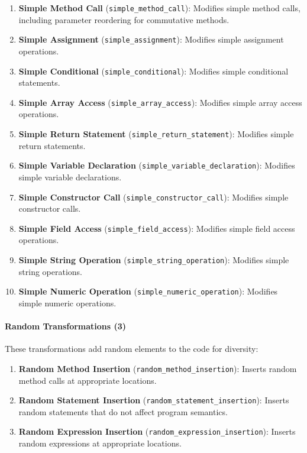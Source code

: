 \documentclass[acmsmall,screen,review,anonymous]{acmart}
\begin{document}
\begin{enumerate}
    \item \textbf{Simple Method Call} (\texttt{simple\_method\_call}): Modifies simple method calls, including parameter reordering for commutative methods.
    
    \item \textbf{Simple Assignment} (\texttt{simple\_assignment}): Modifies simple assignment operations.
    
    \item \textbf{Simple Conditional} (\texttt{simple\_conditional}): Modifies simple conditional statements.
    
    \item \textbf{Simple Array Access} (\texttt{simple\_array\_access}): Modifies simple array access operations.
    
    \item \textbf{Simple Return Statement} (\texttt{simple\_return\_statement}): Modifies simple return statements.
    
    \item \textbf{Simple Variable Declaration} (\texttt{simple\_variable\_declaration}): Modifies simple variable declarations.
    
    \item \textbf{Simple Constructor Call} (\texttt{simple\_constructor\_call}): Modifies simple constructor calls.
    
    \item \textbf{Simple Field Access} (\texttt{simple\_field\_access}): Modifies simple field access operations.
    
    \item \textbf{Simple String Operation} (\texttt{simple\_string\_operation}): Modifies simple string operations.
    
    \item \textbf{Simple Numeric Operation} (\texttt{simple\_numeric\_operation}): Modifies simple numeric operations.
\end{enumerate}

\paragraph{Random Transformations (3)}
These transformations add random elements to the code for diversity:

\begin{enumerate}
    \item \textbf{Random Method Insertion} (\texttt{random\_method\_insertion}): Inserts random method calls at appropriate locations.
    
    \item \textbf{Random Statement Insertion} (\texttt{random\_statement\_insertion}): Inserts random statements that do not affect program semantics.
    
    \item \textbf{Random Expression Insertion} (\texttt{random\_expression\_insertion}): Inserts random expressions at appropriate locations.
\end{enumerate}
\end{document}
